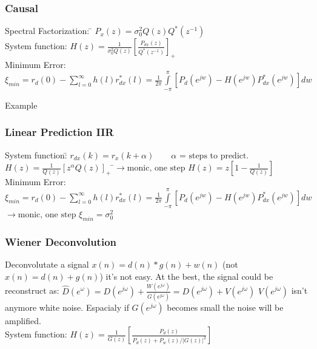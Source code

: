 \subsubsection{Causal }
\begin{tabbing}
Spectral Factorization: \=
$ P_x(z) = \sigma_0^2 Q(z) Q^*(z^{-1}) $\\

System function:\hspace{1.2cm}\>
	$H(z)=\frac{1}{\sigma_0^2 Q(z) } [\frac{P_{dx}(z)}{Q^*(z^{-1})} ]_+ $ \\
	
Minimum Error:\>$\xi_{min} =r_d(0)-\sum \limits_{l=0}^\infty h(l)r_{dx}^{*}(l)
	=\frac{1}{2\pi}\int \limits_{-\pi}^\pi[P_d(e^{jw})-H(e^{jw})P_{dx}^{*}(e^{jw})]dw$\\
	
\end{tabbing}
Example 

\subsubsection{Linear Prediction IIR }
\begin{tabbing}
System function:\hspace{0.2cm}\=
	$ r_{dx}(k)=r_x(k+\alpha)  \qquad \alpha \text{ = steps to predict.} $\\
\>	$ H(z)= \frac{1}{Q(z)}[z^\alpha Q(z)]_+ $ \hspace{6.8cm} \=$\rightarrow \text{monic, one step } H(z) = z [1- \frac{1}{Q(z)}] $\\
Minimum Error:\>
	$\xi_{min} =r_d(0)-\sum \limits_{l=0}^\infty h(l)r_{dx}^{*}(l)
		=\frac{1}{2\pi}\int \limits_{-\pi}^\pi[P_d(e^{jw})-H(e^{jw})P_{dx}^{*}(e^{jw})]dw $\>$ \rightarrow \text{monic, one step } \xi_{min} = \sigma^2_0$\\
\end{tabbing}


\subsubsection{Wiener Deconvolution }
Deconvolutate a signal $x(n)=d(n)\ast g(n) + w(n)$ (not $x(n)=d(n) + g(n)$) it's not easy. At the best, the signal could be reconstruct as:
$\hat{D}(e^{\omega})=D(e^{j\omega}) + \frac{W(e^{j\omega})}{G(e^{j\omega})}=D(e^{j\omega})+V(e^{j\omega})$ \quad $V(e^{j\omega})$ isn't anymore white noise. 
Espacialy if $G(e^{j\omega})$ becomes small the noise will be amplified.\\
System function:\hspace{1.2cm}
	$ H(z)= \frac{1}{G(z)}\left[\frac{P_d(z)}{P_d(z)+P_w(z)/|G(z)|^2}\right]$\\

